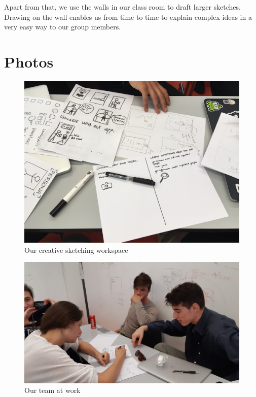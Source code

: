 \documentclass[12pt]{scrartcl}
\begin{document}
	Apart from that, we use the walls in our class room to draft larger sketches. Drawing on the wall enables us from time to time to explain 
	complex ideas in a very easy way to our group members.
	
\section{Photos}

	
	\begin{figure}[H]
        		\centering
       		\includegraphics[width=\textwidth]{../images/group1.jpg}
       		\caption{Our creative sketching workspace}
        		\label{group1}
	\end{figure}
	
	\begin{figure}[H]
        		\centering
       		\includegraphics[width=\textwidth]{../images/group2.jpg}
       		\caption{Our team at work}
        		\label{group2}
	\end{figure}
	
\end{document}
